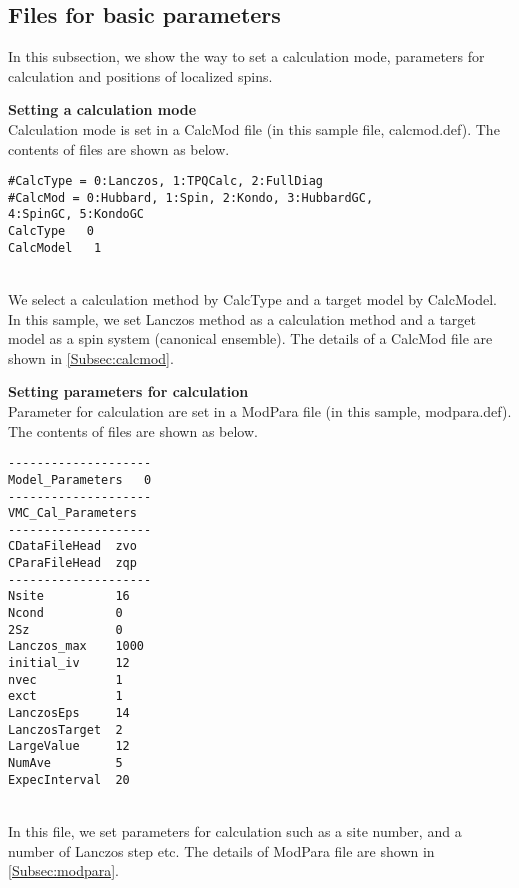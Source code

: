 \subsection{Files for basic parameters}
In this subsection, we show the way to set a calculation mode, parameters for calculation and positions of localized spins.
\begin{description}
\item {\bf Setting a calculation mode}\\
Calculation mode is set in a CalcMod file (in this sample file, calcmod.def). The contents of files are shown as below.\\
\begin{minipage}{15cm}
\begin{screen}
\begin{verbatim}
#CalcType = 0:Lanczos, 1:TPQCalc, 2:FullDiag
#CalcMod = 0:Hubbard, 1:Spin, 2:Kondo, 3:HubbardGC, 
4:SpinGC, 5:KondoGC 
CalcType   0
CalcModel   1
\end{verbatim}
\end{screen}
\end{minipage}
~\\
We select a calculation method by CalcType and a target model by CalcModel. In this sample, we set Lanczos method as a calculation method and a target model as a spin system (canonical ensemble). The details of a CalcMod file are shown in \ref{Subsec:calcmod}.\\

\item {\bf Setting parameters for calculation}\\
Parameter for calculation are set in a ModPara file (in this sample, modpara.def). The contents of files are shown as below.\\
\begin{minipage}{15cm}
\begin{screen}
\begin{verbatim}
--------------------
Model_Parameters   0
--------------------
VMC_Cal_Parameters
--------------------
CDataFileHead  zvo
CParaFileHead  zqp
--------------------
Nsite          16   
Ncond          0    
2Sz            0    
Lanczos_max    1000 
initial_iv     12   
nvec           1    
exct           1    
LanczosEps     14   
LanczosTarget  2    
LargeValue     12   
NumAve         5    
ExpecInterval  20 
\end{verbatim}
\end{screen}
\end{minipage}
~\\
In this file, we set parameters for calculation such as a site number,  and a number of Lanczos step etc. The details of ModPara file are shown in \ref{Subsec:modpara}.\\


\end{description}
